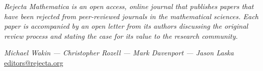 \documentclass[11pt,oneside]{article}
\begin{document}
\hfill

\noindent\small{\emph{Rejecta Mathematica is an open access, online journal that publishes papers that have been rejected from peer-reviewed journals in the mathematical sciences. Each paper is accompanied by an open letter from its authors discussing the original review process and stating the case for its value to the research community.}}

\hfill

\vspace{-1cm}
\begin{center}
\tableofcontents
\end{center}

\noindent \hrulefill



\begin{flushright}
\emph{Michael  Wakin --- Christopher  Rozell --- Mark  Davenport --- Jason  Laska}\\
%
%
\href{mailto:editors@rejecta.org}{{\footnotesize \textsf{editors@rejecta.org}}}\\
\end{flushright}


\newpage










\fancyfoot{} %
\fancyfoot[R]{\thepage}
\renewcommand{\footrulewidth}{0.4pt} 
\end{document}
